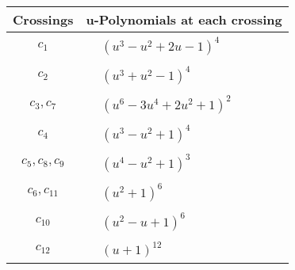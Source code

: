 \documentclass[1p]{elsarticle_modified}
\theoremstyle{definition}
\begin{document}
\begin{tabular}{m{50pt}|m{274pt}}
Crossings & \hspace{64pt}u-Polynomials at each crossing \\
\hline $$\begin{aligned}c_{1}\end{aligned}$$&$\begin{aligned}
&(u^3- u^2+2 u-1)^4
\end{aligned}$\\
\hline $$\begin{aligned}c_{2}\end{aligned}$$&$\begin{aligned}
&(u^3+u^2-1)^4
\end{aligned}$\\
\hline $$\begin{aligned}c_{3},c_{7}\end{aligned}$$&$\begin{aligned}
&(u^6-3 u^4+2 u^2+1)^2
\end{aligned}$\\
\hline $$\begin{aligned}c_{4}\end{aligned}$$&$\begin{aligned}
&(u^3- u^2+1)^4
\end{aligned}$\\
\hline $$\begin{aligned}c_{5},c_{8},c_{9}\end{aligned}$$&$\begin{aligned}
&(u^4- u^2+1)^3
\end{aligned}$\\
\hline $$\begin{aligned}c_{6},c_{11}\end{aligned}$$&$\begin{aligned}
&(u^2+1)^6
\end{aligned}$\\
\hline $$\begin{aligned}c_{10}\end{aligned}$$&$\begin{aligned}
&(u^2- u+1)^6
\end{aligned}$\\
\hline $$\begin{aligned}c_{12}\end{aligned}$$&$\begin{aligned}
&(u+1)^{12}
\end{aligned}$\\
\hline
\end{tabular}\\~\\
\end{document}
